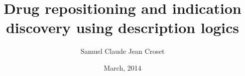 
\title{Drug repositioning and indication discovery
using description logics}

\author{Samuel Claude Jean Croset}





\date{March, 2014}
